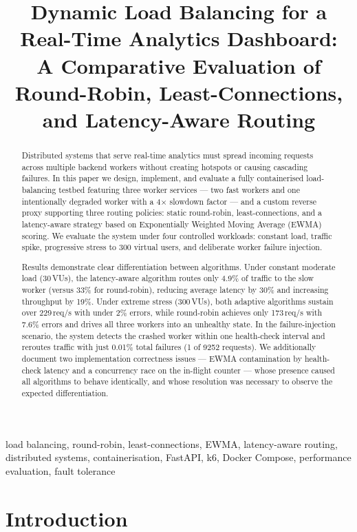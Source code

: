 \documentclass[conference]{IEEEtran}
\title{Dynamic Load Balancing for a Real-Time Analytics Dashboard:\\
A Comparative Evaluation of Round-Robin, Least-Connections,\\
and Latency-Aware Routing}
\author{
\IEEEauthorblockN{Ana Maria Floristean, Razvan-Constantin Croitoru}
\IEEEauthorblockA{Faculty of Computer Science\\
Alexandru Ioan Cuza University, Ia\c{s}i, Romania\\
anafloris23@gmail.com, croitorurazvan1@gmail.com}
}
\begin{document}
\maketitle

\begin{abstract}
Distributed systems that serve real-time analytics must spread incoming
requests across multiple backend workers without creating hotspots or
causing cascading failures. In this paper we design, implement, and
evaluate a fully containerised load-balancing testbed featuring three
worker services --- two fast workers and one intentionally degraded
worker with a 4$\times$ slowdown factor --- and a custom reverse proxy
supporting three routing policies: static round-robin, least-connections,
and a latency-aware strategy based on Exponentially Weighted Moving
Average (EWMA) scoring. We evaluate the system under four controlled
workloads: constant load, traffic spike, progressive stress to 300
virtual users, and deliberate worker failure injection.

Results demonstrate clear differentiation between algorithms. Under
constant moderate load (30\,VUs), the latency-aware algorithm routes
only 4.9\% of traffic to the slow worker (versus 33\% for round-robin),
reducing average latency by 30\% and increasing throughput by 19\%.
Under extreme stress (300\,VUs), both adaptive algorithms sustain over
229\,req/s with under 2\% errors, while round-robin achieves only
173\,req/s with 7.6\% errors and drives all three workers into an
unhealthy state. In the failure-injection scenario, the system detects
the crashed worker within one health-check interval and reroutes traffic
with just 0.01\% total failures (1 of 9252 requests). We additionally
document two implementation correctness issues --- EWMA contamination by
health-check latency and a concurrency race on the in-flight counter ---
whose presence caused all algorithms to behave identically, and whose
resolution was necessary to observe the expected differentiation.
\end{abstract}

\begin{IEEEkeywords}
load balancing, round-robin, least-connections, EWMA, latency-aware
routing, distributed systems, containerisation, FastAPI, k6, Docker
Compose, performance evaluation, fault tolerance
\end{IEEEkeywords}

\section{Introduction}
\end{document}
